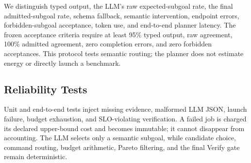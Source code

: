 We distinguish typed output, the LLM's raw expected-subgoal rate, the final
admitted-subgoal rate, schema fallback, semantic intervention, endpoint errors,
forbidden-subgoal acceptance, token use, and end-to-end planner latency.  The
frozen acceptance criteria require at least 95\% typed output,
\PlannerRawThreshold{} raw agreement, 100\% admitted agreement, zero completion
errors, and zero forbidden acceptances.  This protocol tests semantic routing;
the planner does not estimate energy or directly launch a benchmark.

\subsection{Reliability Tests}

Unit and end-to-end tests inject missing evidence, malformed LLM JSON, launch
failure, budget exhaustion, and SLO-violating verification.  A failed job is
charged its declared upper-bound cost and becomes immutable; it cannot disappear
from accounting.  The LLM selects only a semantic subgoal, while candidate
choice, command routing, budget arithmetic, Pareto filtering, and the final Verify
gate remain deterministic.
